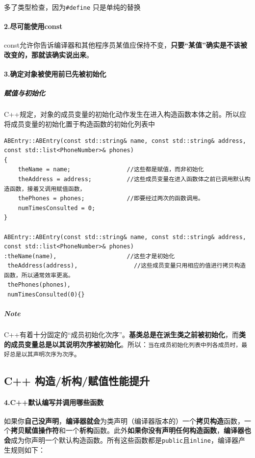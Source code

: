 \documentclass[UTF8,a4paper,12pt]{ctexbook}
\begin{document}
		多了类型检查，因为\verb|#define| 只是单纯的替换
		\paragraph{2.尽可能使用const} const允许你告诉编译器和其他程序员某值应保持不变，\textbf{只要“某值”确实是不该被改变的，那就该确实说出来}。
		\paragraph{3.确定对象被使用前已先被初始化}
			\subparagraph{赋值与初始化} C++规定，对象的成员变量的初始化动作发生在进入构造函数本体之前。所以应将成员变量的初始化置于构造函数的初始化列表中
			
			\begin{lstlisting}
ABEntry::ABEntry(const std::string& name, const std::string& address,
const std::list<PhoneNumber>& phones)
{ 
	theName = name;                //这些都是赋值，而非初始化
	theAddress = address;          //这些成员变量在进入函数体之前已调用默认构造函数，接着又调用赋值函数，
	thePhones = phones;            //即要经过两次的函数调用。            
	numTimesConsulted = 0;
} 
	 
ABEntry::ABEntry(const std::string& name, const std::string& address,
const std::list<PhoneNumber>& phones) 
:theName(name),                    //这些才是初始化 
 theAddress(address),                //这些成员变量只用相应的值进行拷贝构造函数，所以通常效率更高。
 thePhones(phones),
 numTimesConsulted(0){} 
			\end{lstlisting}
				
			\subparagraph{Note}  C++有着十分固定的“成员初始化次序”。\textbf{基类总是在派生类之前被初始化}，而\textbf{类的成员变量总是以其说明次序被初始化}。所以：\verb|当在成员初始化列表中列各成员时，最好总是以其声明次序为次序|。
		\subsection{C++ 构造/析构/赋值性能提升}
		\paragraph{4.C++默认编写并调用哪些函数} 如果你\textbf{自己没声明}，\textbf{编译器就会}为类声明（编译器版本的）一个\textbf{拷贝构造}函数，一个\textbf{拷贝赋值操作符}和一个\textbf{析构}函数。此外\textbf{如果你没有声明任何构造函数}，\textbf{编译器也会}成为你声明一个默认构造函数。所有这些函数都是\verb|public|且\verb|inline|，编译器产生规则如下：
\end{document}
